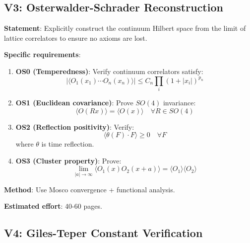\subsection{V3: Osterwalder-Schrader Reconstruction}

\begin{verification}
\textbf{Statement}: Explicitly construct the continuum Hilbert space from 
the limit of lattice correlators to ensure no axioms are lost.

\textbf{Specific requirements}:
\begin{enumerate}
\item \textbf{OS0 (Temperedness)}: Verify continuum correlators satisfy:
\begin{equation}
|\langle O_1(x_1) \cdots O_n(x_n) \rangle| \leq C_n \prod_i (1 + |x_i|)^{p_n}
\end{equation}

\item \textbf{OS1 (Euclidean covariance)}: Prove $SO(4)$ invariance:
\begin{equation}
\langle O(Rx) \rangle = \langle O(x) \rangle \quad \forall R \in SO(4)
\end{equation}

\item \textbf{OS2 (Reflection positivity)}: Verify:
\begin{equation}
\langle \theta(F) \cdot F \rangle \geq 0 \quad \forall F
\end{equation}
where $\theta$ is time reflection.

\item \textbf{OS3 (Cluster property)}: Prove:
\begin{equation}
\lim_{|a| \to \infty} \langle O_1(x) O_2(x+a) \rangle = \langle O_1 \rangle \langle O_2 \rangle
\end{equation}
\end{enumerate}

\textbf{Method}: Use Mosco convergence + functional analysis.

\textbf{Estimated effort}: 40-60 pages.
\end{verification}

\subsection{V4: Giles-Teper Constant Verification}

